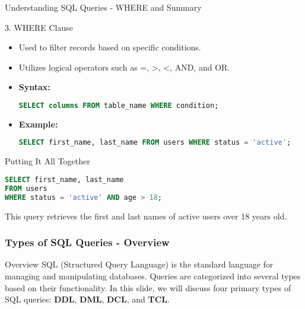 \documentclass[aspectratio=169]{beamer}
\begin{document}
\begin{frame}[fragile]{Understanding SQL Queries - WHERE and Summary}
    \begin{block}{3. WHERE Clause}
        \begin{itemize}
            \item Used to filter records based on specific conditions.
            \item Utilizes logical operators such as =, >, <, AND, and OR.
            \item \textbf{Syntax:}
            \begin{lstlisting}[language=SQL]
SELECT columns FROM table_name WHERE condition;
            \end{lstlisting}
            \item \textbf{Example:}
            \begin{lstlisting}[language=SQL]
SELECT first_name, last_name FROM users WHERE status = 'active';
            \end{lstlisting}
        \end{itemize}
    \end{block}
    
    \begin{block}{Putting It All Together}
        \begin{lstlisting}[language=SQL]
SELECT first_name, last_name 
FROM users 
WHERE status = 'active' AND age > 18;
        \end{lstlisting}
        This query retrieves the first and last names of active users over 18 years old.
    \end{block}
\end{frame}

\begin{frame}[fragile]
    \frametitle{Types of SQL Queries - Overview}
    \begin{block}{Overview}
        SQL (Structured Query Language) is the standard language for managing and manipulating databases. Queries are categorized into several types based on their functionality. 
        In this slide, we will discuss four primary types of SQL queries: \textbf{DDL}, \textbf{DML}, \textbf{DCL}, and \textbf{TCL}.
    \end{block}
\end{frame}
\end{document}
